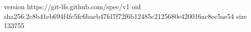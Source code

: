 version https://git-lfs.github.com/spec/v1
oid sha256:2c8b41eb694f4fc5fc6baeb47fd7f72f6b12485c2125680e420016ac8ec5ae54
size 133755
